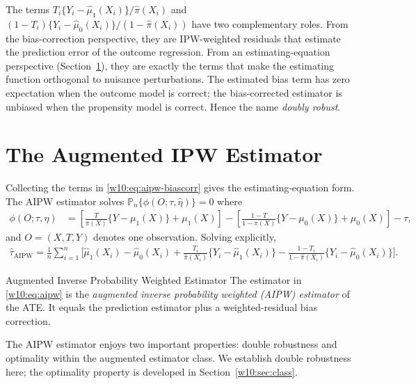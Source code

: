 \documentclass[master.tex]{subfiles}
\begin{document}
\begin{remark}
\label{w10:rem:two-interp}
The terms $T_i\{Y_i-\hat\mu_1(X_i)\}/\hat\pi(X_i)$ and
$(1-T_i)\{Y_i-\hat\mu_0(X_i)\}/(1-\hat\pi(X_i))$ have two
complementary roles.  From the bias-correction perspective, they are
IPW-weighted residuals that estimate the prediction error of the
outcome regression.  From an estimating-equation perspective
(Section~\ref{w10:sec:aipw}), they are exactly the terms that make
the estimating function orthogonal to nuisance perturbations.  The
estimated bias term has zero expectation when the outcome model is
correct; the bias-corrected estimator is unbiased when the propensity
model is correct.  Hence the name \emph{doubly robust}.
\end{remark}

\section{The Augmented IPW Estimator}
\label{w10:sec:aipw}

Collecting the terms in \eqref{w10:eq:aipw-biascorr} gives the
estimating-equation form.  The AIPW estimator solves
$\mathbb{P}_n\{\phi(O;\tau,\hat\eta)\} = 0$ where
\begin{align}
  \phi(O;\tau,\eta)
  &= \left[
       \frac{T}{\pi(X)}\{Y-\mu_1(X)\}+\mu_1(X)
     \right]
     - \left[
         \frac{1-T}{1-\pi(X)}\{Y-\mu_0(X)\}+\mu_0(X)
       \right]
     - \tau,
  \label{w10:eq:dr-score}
\end{align}
and $O=(X,T,Y)$ denotes one observation.  Solving explicitly,
\begin{align}
  \hat\tau_{\mathrm{AIPW}}
  = \frac{1}{n}\sum_{i=1}^n
    \Bigg[
      \hat\mu_1(X_i) - \hat\mu_0(X_i)
      + \frac{T_i}{\hat\pi(X_i)}\{Y_i - \hat\mu_1(X_i)\}
      - \frac{1-T_i}{1-\hat\pi(X_i)}\{Y_i - \hat\mu_0(X_i)\}
    \Bigg].
  \label{w10:eq:aipw}
\end{align}

\begin{defn}{Augmented Inverse Probability Weighted Estimator}
\label{w10:defn:aipw}
The estimator in \eqref{w10:eq:aipw} is the \emph{augmented
inverse probability weighted (AIPW) estimator} of the ATE.  It
equals the prediction estimator plus a weighted-residual bias
correction.
\end{defn}

The AIPW estimator enjoys two important properties: double robustness
and optimality within the augmented estimator class.  We establish
double robustness here; the optimality property is developed in
Section~\ref{w10:sec:class}.
\end{document}
